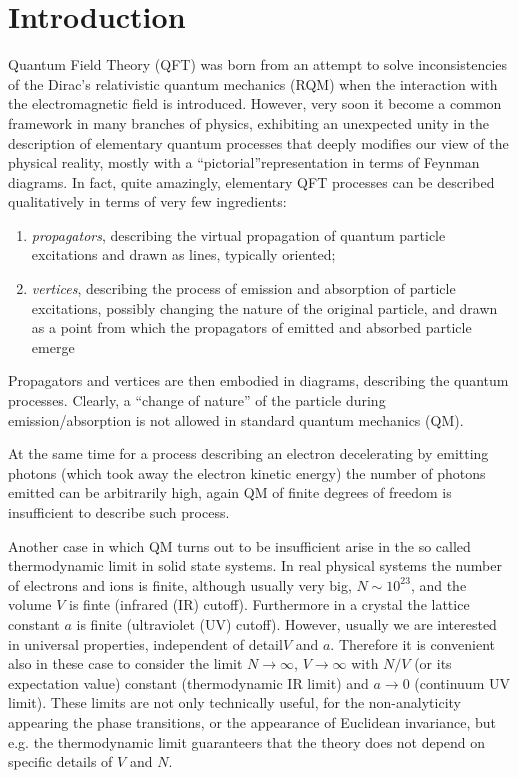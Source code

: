\documentclass[../main/main.tex]{subfiles}
\begin{document}

\chapter{Introduction} 

Quantum Field Theory (QFT) was born from an attempt to solve inconsistencies of the Dirac's relativistic quantum mechanics (RQM) when the interaction with the electromagnetic field is introduced. However, very soon it become a common framework in many branches of physics, exhibiting an unexpected unity in the description of elementary quantum processes that deeply modifies our view of the physical reality, mostly with a ``pictorial''representation in terms of Feynman diagrams. In fact, quite amazingly, elementary QFT processes can be described qualitatively in terms of  very few ingredients:
\begin{enumerate}[label=\textbullet]
	\item \emph{propagators}, describing the virtual propagation of quantum particle excitations and drawn as lines, typically oriented;
	\item \emph{vertices}, describing the process of emission and absorption of particle excitations, possibly changing the nature of the original particle, and drawn as a point from which the propagators of emitted and absorbed particle emerge
\end{enumerate}
Propagators and vertices are then embodied in diagrams, describing the quantum processes. Clearly, a ``change of nature'' of the particle during emission/absorption is not allowed in standard quantum mechanics (QM). 

At the same time for a process describing an electron decelerating by emitting photons (which took away the electron kinetic energy) the number of photons emitted can be arbitrarily high, again QM of finite degrees of freedom is insufficient to describe such process. 

Another case in which QM turns out to be insufficient arise in the so called thermodynamic limit in solid state systems. In real physical systems the number of electrons and ions is finite, although usually very big, $N\sim10^{23}$, and the volume $V$ is finte (infrared (IR) cutoff). Furthermore in a crystal the lattice constant $a$ is finite (ultraviolet (UV) cutoff). However, usually we are interested in universal properties, independent of detail$V$ and $a$. Therefore it is convenient also in these case to consider the limit $N\to\infty$, $V\to\infty$ with $N/V$ (or its expectation value) constant (thermodynamic IR limit) and $a\to0$ (continuum UV limit). These limits are not only technically useful, for the non-analyticity appearing the phase transitions, or the appearance of Euclidean invariance, but e.g. the thermodynamic limit guaranteers that the theory does not depend on specific details of $V$ and $N$. 
\end{document}

